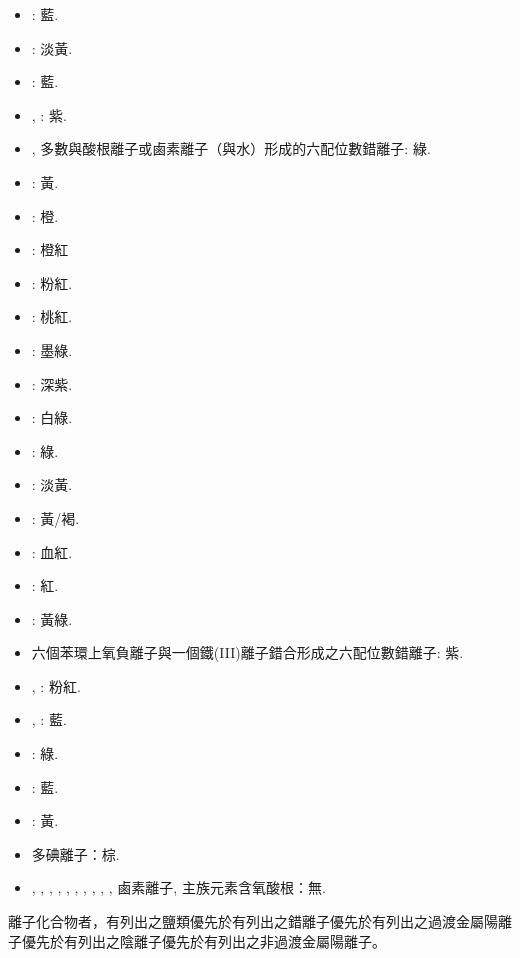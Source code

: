 \documentclass[a4paper,12pt]{report}
\begin{document}
\begin{itemize}
\item {}: 藍.
\item {}: 淡黃.
\item {}: 藍.
\item {}, : 紫.
\item {}, 多數與酸根離子或鹵素離子（與水）形成的六配位數錯離子: 綠.
\item {}: 黃.
\item {}: 橙.
\item {}: 橙紅
\item {}: 粉紅.
\item {}: 桃紅.
\item {}: 墨綠.
\item {}: 深紫.
\item {}: 白綠.
\item {}: 綠.
\item {}: 淡黃.
\item {}: 黃/褐.
\item {}: 血紅.
\item {}: 紅.
\item {}: 黃綠.
\item 六個苯環上氧負離子與一個鐵(III)離子錯合形成之六配位數錯離子: 紫.
\item {}, : 粉紅.
\item {}, : 藍.
\item {}: 綠.
\item {}: 藍.
\item {}: 黃.
\item 多碘離子：棕.
\item {}, , , , , , , , , , 鹵素離子, 主族元素含氧酸根：無.
\end{itemize}
離子化合物者，有列出之鹽類優先於有列出之錯離子優先於有列出之過渡金屬陽離子優先於有列出之陰離子優先於有列出之非過渡金屬陽離子。
\end{document}
